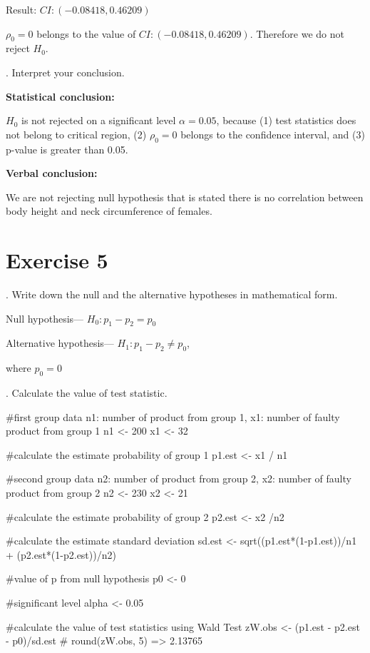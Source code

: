 \documentclass[12pt, oneside]{report}\usepackage[]{graphicx}\usepackage[]{color}
\begin{document}
Result: $CI: (-0.08418, 0.46209)$ \newline

$\rho_0 = 0$ belongs to the value of $CI: (-0.08418, 0.46209)$. Therefore we do not reject $H_0$. \newline

. Interpret your conclusion. \newline

{\bf Statistical conclusion:} \newline

$H_0$ is not rejected on a significant level $\alpha = 0.05$, because (1) test statistics does not belong to critical region, (2) $\rho_0 = 0$ belongs to the confidence interval, and (3) p-value is greater than 0.05. \newline 

{\bf Verbal conclusion:} \newline

We are not rejecting null hypothesis that is stated there is no correlation between body height and neck circumference of females. \newline

\section*{Exercise 5}
. Write down the null and the alternative hypotheses in mathematical form. \newline

Null hypothesis— $H_0: p_1 - p_2 = p_0$ \newline

Alternative hypothesis— $H_1: p_1 - p_2 \neq p_0$, \newline

where $p_0 = 0$\newline

. Calculate the value of test statistic.
\begin{Schunk}
\begin{Sinput}
#first group data n1: number of product from group 1, x1: number of faulty product from group 1
n1 <- 200
x1 <- 32

#calculate the estimate probability of group 1
p1.est <- x1 / n1

#second group data n2: number of product from group 2, x2: number of faulty product from group 2
n2 <- 230
x2 <- 21

#calculate the estimate probability of group 2
p2.est <- x2 /n2

#calculate the estimate standard deviation
sd.est <- sqrt((p1.est*(1-p1.est))/n1 + (p2.est*(1-p2.est))/n2)

#value of p from null hypothesis
p0 <- 0

#significant level
alpha <- 0.05

#calculate the value of test statistics using Wald Test
zW.obs <- (p1.est - p2.est - p0)/sd.est
# round(zW.obs, 5) => 2.13765
\end{Sinput}
\end{Schunk}
\end{document}

